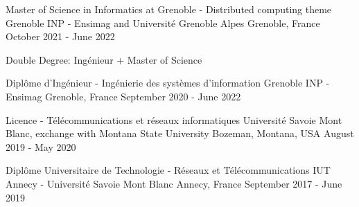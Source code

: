 

\begin{cventries}
\cventry
{Master of Science in Informatics at Grenoble - Distributed computing theme} %
{Grenoble INP - Ensimag and Université Grenoble Alpes} %
{Grenoble, France} %
{October 2021 - June 2022} %
{
  \begin{cvitems}
    \item Double Degree: Ingénieur + Master of Science
  \end{cvitems}
}

\cventry
{Diplôme d'Ingénieur - Ingénierie des systèmes d'information} %
{Grenoble INP - Ensimag} %
{Grenoble, France} %
{September 2020 - June 2022} %
{
}

\cventry
{Licence - Télécommunications et réseaux informatiques} %
{Université Savoie Mont Blanc, exchange with Montana State University} %
{Bozeman, Montana, USA} %
{August 2019 - May 2020} %
{
}

\cventry
{Diplôme Universitaire de Technologie - Réseaux et Télécommunications} %
{IUT Annecy - Université Savoie Mont Blanc} %
{Annecy, France} %
{September 2017 - June 2019} %
{
}






\end{cventries}
